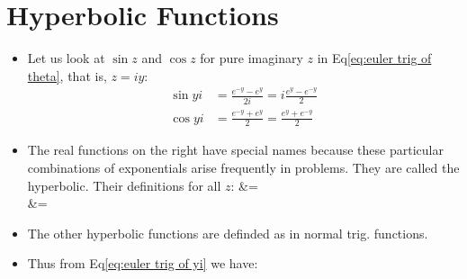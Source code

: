         \section{Hyperbolic Functions}
            \begin{itemize}
                \item Let us look at $\sin{z}$ and $\cos{z}$ for pure imaginary $z$ in Eq\eqref{eq:euler trig of theta}, that is, $z = iy$:
                \begin{align} \label{eq:euler trig of yi}
                    \sin{yi}&=\frac{e^{-y} - e^{y}}{2i} = i \frac{e^y-e^{-y}}{2}\\
                    \cos{yi}&=\frac{e^{-y} + e^{y}}{2} = \frac{e^y + e^{-y}}{2}
                \end{align}
                \item The real functions on the right have special names because these particular 
                combinations of exponentials arise frequently in problems. They are called the hyperbolic. 
                Their definitions for all $z$:
                {&=\\
                &=}
                \item The other hyperbolic functions are definded as in normal trig. functions.
                \item Thus from Eq\eqref{eq:euler trig of yi} we have:
            \end{itemize}